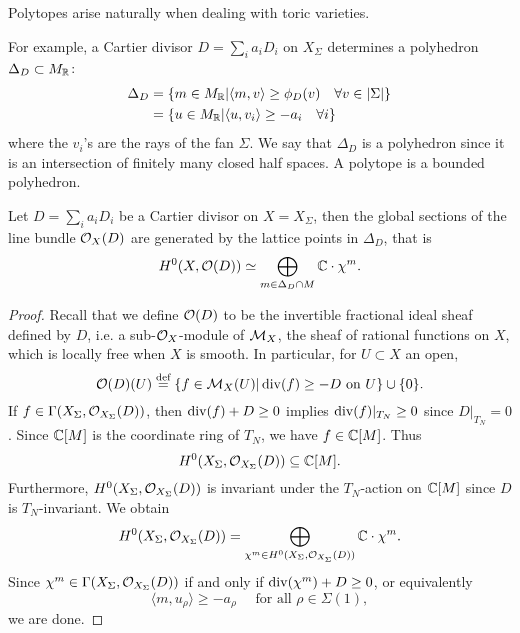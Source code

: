 \documentclass[../main.tex]{subfiles}
\begin{document}
Polytopes arise naturally when dealing with toric varieties.


For example, a Cartier divisor $D = \sum_i a_i D_i$ on $X_\Sigma$ determines a polyhedron $\Delta_D \subset M_{\mathbb{R}}$:
\begin{align*}
\Delta_D &= \{ m \in M_{\mathbb{R}} | \langle m, v \rangle \geq \phi_D(v) \quad \forall v \in |\Sigma| \}  \\ &= \{ u \in M_{\mathbb{R}} | \langle u, v_i \rangle \geq -a_i \quad \forall i \} 
\end{align*}
where the $v_i$'s are the rays of the fan $\Sigma$.
We say that $\Delta_D$ is a polyhedron since it is an intersection of finitely many closed half spaces. A polytope is a bounded polyhedron.


\begin{lemma} \textup{\cite[Prop. 4.3.3]{CLS11}}
    Let $D = \sum_i a_i D_i$ be a Cartier divisor on $X=X_\Sigma$, then the global sections of the line bundle $\mathcal{O}_X(D)$ are generated by the lattice points in $\Delta_D$, that is
    \[
    H^0(X,\mathcal{O}(D)) \simeq \bigoplus_{m \in \Delta_D \cap M} \mathbb{C} \cdot {\chi^m}. 
    \]
\end{lemma} 
\begin{proof}
    Recall that we define $\mathcal{O}(D)$ to be the invertible fractional ideal sheaf defined by $D$, i.e. a sub-$\mathcal{O}_X$-module of $\mathcal{M}_X$, the sheaf of rational functions on $X$, which is locally free when $X$ is smooth. In particular, for $U \subset X$ an open, 
    \[
    \mathcal{O}(D)(U) \stackrel{\text{def}}{=} \{ f \in \mathcal{M}_X(U) | \operatorname{div}(f) \geq -D \text{ on } U \} \cup \{0\}.
    \]
     If $f \in \Gamma(X_\Sigma,\mathcal{O}_{X_\Sigma}(D))$, then $\operatorname{div}(f) + D \geq 0$ implies $\operatorname{div}(f)|_{T_N} \geq 0$ since $D|_{T_N} = 0$. Since $\mathbb{C}[M]$ is the coordinate ring of $T_N$, we have $f \in \mathbb{C}[M]$. Thus
     \[
     H^0(X_\Sigma,\mathcal{O}_{X_\Sigma}(D)) \subseteq \mathbb{C}[M].
     \]
Furthermore, $H^0(X_\Sigma,\mathcal{O}_{X_\Sigma}(D))$ is invariant under the $T_N$-action on $\mathbb{C}[M]$ since $D$ is $T_N$-invariant. We obtain
\[
H^0(X_\Sigma,\mathcal{O}_{X_\Sigma}(D)) = \bigoplus_{\chi^m \in H^0(X_\Sigma,\mathcal{O}_{X_\Sigma}(D))} \mathbb{C} \cdot \chi^m.
\]
Since $\chi^m \in \Gamma(X_\Sigma,\mathcal{O}_{X_\Sigma}(D))$ if and only if $\operatorname{div}(\chi^m) +D \geq 0$, or equivalently
\[
\langle m,u_\rho \rangle \geq -a_\rho \quad \text{ for all } \rho \in \Sigma(1),
\]
we are done.
\end{proof}
\end{document}
